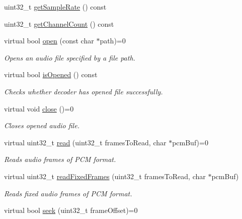 \begin{DoxyCompactItemize}
\item 
uint32\+\_\+t \hyperlink{classcocos2d_1_1experimental_1_1AudioDecoder_af721fc8972c793a0b255dbb3e2f7c6a0}{get\+Sample\+Rate} () const
\item 
uint32\+\_\+t \hyperlink{classcocos2d_1_1experimental_1_1AudioDecoder_a1363284022c82ca8b6945a2b8c324410}{get\+Channel\+Count} () const
\item 
virtual bool \hyperlink{classcocos2d_1_1experimental_1_1AudioDecoder_a27747e5f9671a16852997fe852e28e71}{open} (const char $\ast$path)=0
\begin{DoxyCompactList}\small\item\em Opens an audio file specified by a file path. \end{DoxyCompactList}\item 
virtual bool \hyperlink{classcocos2d_1_1experimental_1_1AudioDecoder_a7770924862903dd30250767e1b322c36}{is\+Opened} () const
\begin{DoxyCompactList}\small\item\em Checks whether decoder has opened file successfully. \end{DoxyCompactList}\item 
virtual void \hyperlink{classcocos2d_1_1experimental_1_1AudioDecoder_a89e94516cd7103d98475dc27462a58a7}{close} ()=0
\begin{DoxyCompactList}\small\item\em Closes opened audio file. \end{DoxyCompactList}\item 
virtual uint32\+\_\+t \hyperlink{classcocos2d_1_1experimental_1_1AudioDecoder_a952b42c3785402bac2166c8dd1af543c}{read} (uint32\+\_\+t frames\+To\+Read, char $\ast$pcm\+Buf)=0
\begin{DoxyCompactList}\small\item\em Reads audio frames of P\+CM format. \end{DoxyCompactList}\item 
virtual uint32\+\_\+t \hyperlink{classcocos2d_1_1experimental_1_1AudioDecoder_aa4f78c77e07a069be14148ce2d78d333}{read\+Fixed\+Frames} (uint32\+\_\+t frames\+To\+Read, char $\ast$pcm\+Buf)
\begin{DoxyCompactList}\small\item\em Reads fixed audio frames of P\+CM format. \end{DoxyCompactList}\item 
virtual bool \hyperlink{classcocos2d_1_1experimental_1_1AudioDecoder_a290db97d8d4b00b6d09e145cd123b58b}{seek} (uint32\+\_\+t frame\+Offset)=0

\end{DoxyCompactItemize}
